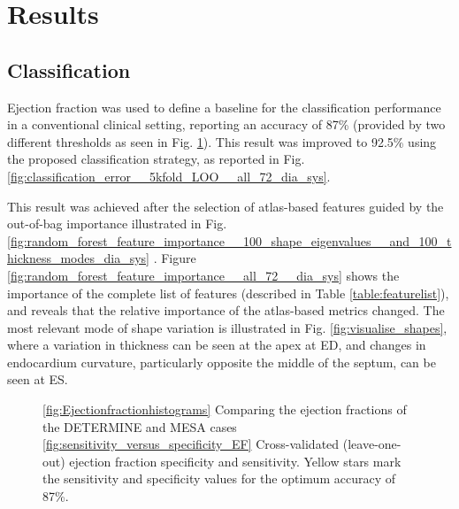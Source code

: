 \documentclass{llncs}
\begin{document}
\section{Results}
	\subsection{Classification}
Ejection fraction was used to define a baseline for the classification performance in a conventional clinical setting, reporting an accuracy of 87\% (provided by two different thresholds as seen in Fig. \ref{fig:EFs}). This result was improved to 92.5\% using the proposed classification strategy, as reported in Fig.    \ref{fig:classification_error__5kfold_LOO__all_72_dia_sys}. 

This result was achieved after the selection of atlas-based features guided by the out-of-bag importance illustrated in Fig. \ref{fig:random_forest_feature_importance__100_shape_eigenvalues__and_100_thickness_modes_dia_sys} . Figure \ref{fig:random_forest_feature_importance__all_72__dia_sys} shows the importance of the complete list of features (described in Table \ref{table:featurelist}), and reveals that the relative importance of the atlas-based metrics changed. The most relevant mode of shape variation is illustrated in Fig. \ref{fig:visualise_shapes}, where a variation in thickness can be seen at the apex at ED, and changes in endocardium curvature, particularly opposite the middle of the septum, can be seen at ES. 

		
		\begin{figure}[]
		\begin{center}
		
		

\caption{ \ref{fig:Ejectionfractionhistograms} Comparing the ejection fractions of the DETERMINE and MESA cases \ref{fig:sensitivity_versus_specificity_EF} Cross-validated (leave-one-out) ejection fraction specificity and sensitivity. Yellow stars mark the sensitivity and specificity values for the optimum accuracy of 87\%.}
\label{fig:EFs}
  
\end{center}

		\end{figure}
\end{document}

